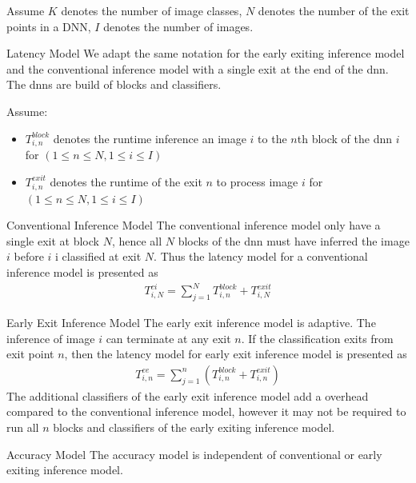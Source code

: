 Assume $ K $ denotes the number of image classes, $ N $ denotes the number of the exit points in a DNN, $ I $ denotes the number of images.
	\begin{enumdescript}
		\item[Latency Model] We adapt the same notation for the early exiting inference model and the conventional inference model with a single exit at the end of the \gls{dnn}. The \gls{dnn}s are build of blocks and classifiers.
		
		Assume:
		\begin{itemize}
			\item $T_{i,n}^{block}$ denotes the runtime inference an image $ i $ to the $ n $th block of the \gls{dnn} $ i $ for $ \left(1\leq n \leq N, 1 \leq i \leq I\right) $
			\item $T_{i,n}^{exit}$ denotes the runtime of the exit $ n $  to process image $i$ for $ \left(1\leq n \leq N, 1 \leq i \leq I\right) $
		\end{itemize}
		\begin{enumdescript}
			\item[Conventional Inference Model] The conventional inference model only have a single exit at block $ N $, hence all $ N $ blocks of the \gls{dnn} must have inferred the image $ i $ before $ i $ i classified at exit $ N $. Thus the latency model for a conventional inference model is presented as
			\begin{align}
			T^{ci}_{i,N}= \sum_{j=1}^{N} T_{i,n}^{block} + T_{i,N}^{exit}
			\end{align}
			\item[Early Exit Inference Model] The early exit inference model is adaptive. The inference of image $ i $ can terminate at any exit $ n $. If the classification exits from exit point $ n $, then the latency model for early exit inference model is presented as
			\begin{align}
			T_{i,n}^{ee}=\sum_{j=1}^{n} \left(T_{i,n}^{block} + T_{i,n}^{exit} \right) 
			\end{align}
			The additional classifiers of the early exit inference model add a overhead compared to the conventional inference model, however it may not be required to run all $ n $ blocks and classifiers of the early exiting inference model. 
		\end{enumdescript}
		
					
		
		\item[Accuracy Model] The accuracy model is independent of conventional or early exiting inference model. 
		

\end{enumdescript}
